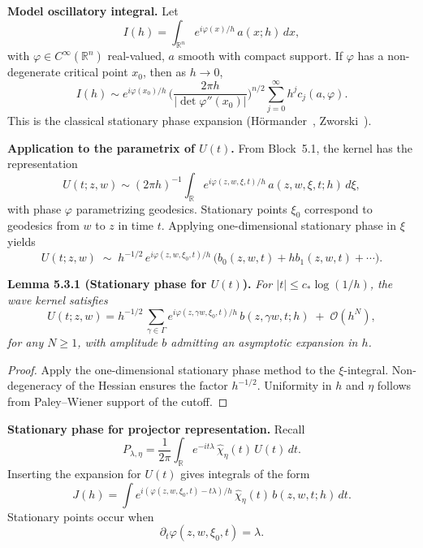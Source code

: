 \medskip

\noindent\textbf{Model oscillatory integral.}
Let
\[
   I(h) = \int_{\mathbb{R}^n} e^{i\varphi(x)/h} \, a(x;h)\, dx,
\]
with $\varphi\in C^\infty(\mathbb{R}^n)$ real-valued, $a$ smooth with compact support.
If $\varphi$ has a non-degenerate critical point $x_0$,
then as $h\to 0$,
\[
   I(h) \sim e^{i\varphi(x_0)/h} \,
   \Big(\frac{2\pi h}{|\det \varphi''(x_0)|}\Big)^{n/2}
   \sum_{j=0}^\infty h^j c_j(a,\varphi).
\]
This is the classical stationary phase expansion
(Hörmander~\cite{Hormander1994}, Zworski~\cite{Zworski2012}).

\medskip

\noindent\textbf{Application to the parametrix of $U(t)$.}
From Block~5.1, the kernel has the representation
\[
   U(t;z,w) \sim (2\pi h)^{-1} \int_{\mathbb{R}} 
   e^{i\varphi(z,w,\xi,t)/h}\, a(z,w,\xi,t;h)\, d\xi,
\]
with phase $\varphi$ parametrizing geodesics.
Stationary points $\xi_0$ correspond to geodesics from $w$ to $z$ in time $t$.
Applying one-dimensional stationary phase in $\xi$ yields
\[
   U(t;z,w) \;\sim\; h^{-1/2}\,
   e^{i\varphi(z,w,\xi_0,t)/h}\,
   \Big( b_0(z,w,t) + h b_1(z,w,t) + \cdots \Big).
\]

\medskip

\noindent\textbf{Lemma 5.3.1 (Stationary phase for $U(t)$).}
\emph{For $|t|\le c_* \log(1/h)$,
the wave kernel satisfies}
\[
   U(t;z,w) = h^{-1/2}\,
   \sum_{\gamma\in\Gamma} e^{i\varphi(z,\gamma w,\xi_0,t)/h}\,
   b(z,\gamma w,t;h) \;+\; \mathcal{O}(h^N),
\]
\emph{for any $N\ge 1$,
with amplitude $b$ admitting an asymptotic expansion in $h$.}

\begin{proof}
Apply the one-dimensional stationary phase method to the $\xi$-integral.
Non-degeneracy of the Hessian ensures the factor $h^{-1/2}$.
Uniformity in $h$ and $\eta$ follows from Paley–Wiener support of the cutoff.
\end{proof}

\medskip

\noindent\textbf{Stationary phase for projector representation.}
Recall
\[
   P_{\lambda,\eta} = \frac{1}{2\pi}\int_{\mathbb{R}}
   e^{-it\lambda}\, \widehat{\chi}_\eta(t)\, U(t)\, dt.
\]
Inserting the expansion for $U(t)$ gives integrals of the form
\[
   J(h) = \int e^{i(\varphi(z,w,\xi_0,t) - t\lambda)/h}\,
   \widehat{\chi}_\eta(t)\, b(z,w,t;h)\, dt.
\]
Stationary points occur when
\[
   \partial_t \varphi(z,w,\xi_0,t) = \lambda.
\]

\medskip

